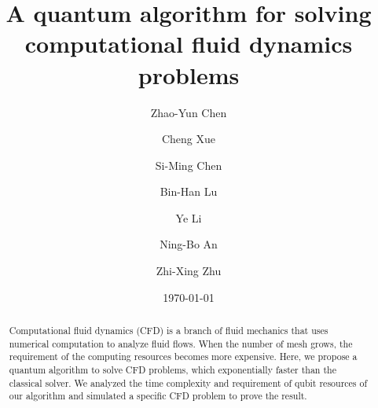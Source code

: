 \documentclass[%
 reprint,
 amsmath,amssymb,
pra,
]{revtex4-1}
\begin{document}

\title{A quantum algorithm for solving computational fluid dynamics problems}

\author{Zhao-Yun Chen}
\author{Cheng Xue}%
\author{Si-Ming Chen}
\author{Bin-Han Lu}
\author{Ye Li}
\author{Ning-Bo An}
\author{Zhi-Xing Zhu}




\date{\today}%

\begin{abstract}
    Computational fluid dynamics (CFD) is a branch of fluid mechanics that uses numerical computation to analyze fluid flows. When the number of mesh grows, the requirement of the computing resources becomes more expensive. Here, we propose a quantum algorithm to solve CFD problems, which exponentially faster than the classical solver. We analyzed the time complexity and requirement of qubit resources of our algorithm and simulated a specific CFD problem to prove the result.

\end{abstract}
\end{document}

